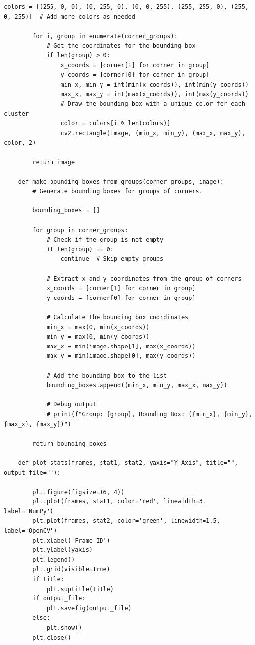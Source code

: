 \documentclass[11pt, conference, letterpaper]{IEEEtran}
\begin{document}
\begin{lstlisting}[style=python, caption={\texttt{plot\_utils.py}}, label={lst:putils}]
        colors = [(255, 0, 0), (0, 255, 0), (0, 0, 255), (255, 255, 0), (255, 0, 255)]  # Add more colors as needed
        
        for i, group in enumerate(corner_groups):
            # Get the coordinates for the bounding box
            if len(group) > 0:
                x_coords = [corner[1] for corner in group]
                y_coords = [corner[0] for corner in group]
                min_x, min_y = int(min(x_coords)), int(min(y_coords))
                max_x, max_y = int(max(x_coords)), int(max(y_coords))
                # Draw the bounding box with a unique color for each cluster
                color = colors[i % len(colors)]
                cv2.rectangle(image, (min_x, min_y), (max_x, max_y), color, 2)
    
        return image
    
    def make_bounding_boxes_from_groups(corner_groups, image):
        # Generate bounding boxes for groups of corners.
        
        bounding_boxes = []
        
        for group in corner_groups:
            # Check if the group is not empty
            if len(group) == 0:
                continue  # Skip empty groups
    
            # Extract x and y coordinates from the group of corners
            x_coords = [corner[1] for corner in group]
            y_coords = [corner[0] for corner in group]
            
            # Calculate the bounding box coordinates
            min_x = max(0, min(x_coords))
            min_y = max(0, min(y_coords))
            max_x = min(image.shape[1], max(x_coords))
            max_y = min(image.shape[0], max(y_coords))
            
            # Add the bounding box to the list
            bounding_boxes.append((min_x, min_y, max_x, max_y))
    
            # Debug output
            # print(f"Group: {group}, Bounding Box: ({min_x}, {min_y}, {max_x}, {max_y})")
    
        return bounding_boxes
    
    def plot_stats(frames, stat1, stat2, yaxis="Y Axis", title="", output_file=""):
        
        plt.figure(figsize=(6, 4))
        plt.plot(frames, stat1, color='red', linewidth=3, label='NumPy')
        plt.plot(frames, stat2, color='green', linewidth=1.5, label='OpenCV')
        plt.xlabel('Frame ID')
        plt.ylabel(yaxis)
        plt.legend()
        plt.grid(visible=True)
        if title:
            plt.suptitle(title)
        if output_file:
            plt.savefig(output_file)
        else:
            plt.show()
        plt.close()
    

\end{lstlisting}
\end{document}
